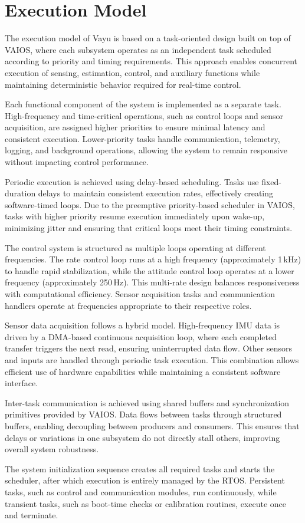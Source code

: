 \section{Execution Model}
\label{sec:vayu_execution}

The execution model of Vayu is based on a task-oriented design built on top of VAIOS, where each subsystem operates as an independent task scheduled according to priority and timing requirements. This approach enables concurrent execution of sensing, estimation, control, and auxiliary functions while maintaining deterministic behavior required for real-time control.

Each functional component of the system is implemented as a separate task. High-frequency and time-critical operations, such as control loops and sensor acquisition, are assigned higher priorities to ensure minimal latency and consistent execution. Lower-priority tasks handle communication, telemetry, logging, and background operations, allowing the system to remain responsive without impacting control performance.

Periodic execution is achieved using delay-based scheduling. Tasks use fixed-duration delays to maintain consistent execution rates, effectively creating software-timed loops. Due to the preemptive priority-based scheduler in VAIOS, tasks with higher priority resume execution immediately upon wake-up, minimizing jitter and ensuring that critical loops meet their timing constraints.

The control system is structured as multiple loops operating at different frequencies. The rate control loop runs at a high frequency (approximately 1\,kHz) to handle rapid stabilization, while the attitude control loop operates at a lower frequency (approximately 250\,Hz). This multi-rate design balances responsiveness with computational efficiency. Sensor acquisition tasks and communication handlers operate at frequencies appropriate to their respective roles.

Sensor data acquisition follows a hybrid model. High-frequency IMU data is driven by a DMA-based continuous acquisition loop, where each completed transfer triggers the next read, ensuring uninterrupted data flow. Other sensors and inputs are handled through periodic task execution. This combination allows efficient use of hardware capabilities while maintaining a consistent software interface.

Inter-task communication is achieved using shared buffers and synchronization primitives provided by VAIOS. Data flows between tasks through structured buffers, enabling decoupling between producers and consumers. This ensures that delays or variations in one subsystem do not directly stall others, improving overall system robustness.

The system initialization sequence creates all required tasks and starts the scheduler, after which execution is entirely managed by the RTOS. Persistent tasks, such as control and communication modules, run continuously, while transient tasks, such as boot-time checks or calibration routines, execute once and terminate.
